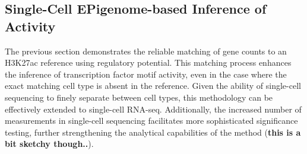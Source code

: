 \subsection{Single-Cell EPigenome-based Inference of Activity}

The previous section demonstrates the reliable matching of gene counts to an H3K27ac reference using regulatory potential. This matching process enhances the inference of transcription factor motif activity, even in the case where the exact matching cell type is absent in the reference. Given the ability of single-cell sequencing to finely separate between cell types, this methodology can be effectively extended to single-cell RNA-seq. Additionally, the increased number of measurements in single-cell sequencing facilitates more sophisticated significance testing, further strengthening the analytical capabilities of the method (\textbf{this is a bit sketchy though..}).

